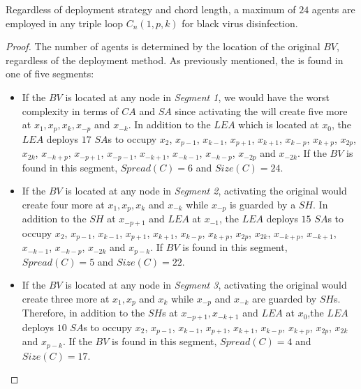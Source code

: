 \begin{theorem}

Regardless of deployment strategy and chord length, a maximum of $24$ agents are employed  in   any   triple loop $C_n(1,p,k)$ for black virus disinfection.
\end{theorem}
\begin{proof}
The number of agents is determined by the location of the original $BV$, regardless of the deployment method. As previously mentioned, the \bv is found in one of five segments:
\begin{itemize} 
\item 
If the $BV$ is located at any node in {\em Segment 1}, we would have the worst complexity in terms of $CA$ and $SA$ since activating the \bv will create five more \bvs at $x_{1},x_{p},x_{k},x_{-p}$  and $x_{-k}$. In addition to the $LEA$ which is located at $x_{0}$, the $LEA$ deploys $17$  $SA$s to occupy $x_{2}$, $ x_{p-1}$,  $x_{k-1}$, $x_{p+1}$, $x_{k+1}$, $x_{k-p}$, $x_{k+p}$, $x_{2p}$, $x_{2k}$, $x_{-k+p}$, $x_{-p+1}$, $x_{-p-1}$, $x_{-k+1}$, $x_{-k-1}$, $x_{-k-p}$, $x_{-2p}$ and $x_{-2k}$. If the $BV$ is found in this segment, $Spread(C)=6$ and $Size(C)=24$.  
 
\item If the $BV$ is located at any node in {\em Segment 2}, activating the original \bv would create four more \bvs at $x_{1},x_{p},x_{k}$ and $x_{-k}$ while $x_{-p}$ is guarded by a $SH$. In addition to the $SH$ at $x_{-p+1}$ and $LEA$ at $x_{-1}$, the $LEA$ deploys $15$  $SA$s to occupy $x_{2}$, $x_{p-1}$,  $x_{k-1}$, $x_{p+1}$, $x_{k+1}$, $x_{k-p}$, $x_{k+p}$, $x_{2p}$, $x_{2k}$, $x_{-k+p}$, $x_{-k+1}$, $x_{-k-1}$, $x_{-k-p}$, $x_{-2k}$ and $x_{p-k}$. If $BV$ is found in this segment, $Spread(C)=5$ and $Size(C)=22$.   

\item If the $BV$ is located at any node in {\em Segment 3}, activating the original \bv would create three more \bvs at $x_{1},x_{p}$ and $x_{k}$ while $x_{-p}$ and $x_{-k}$ are guarded by $SH$s. Therefore, in addition to the $SH$s at $x_{-p+1},x_{-k+1}$ and $LEA$ at $x_{0}$,the $LEA$ deploys $10$  $SA$s to occupy $x_{2}$, $x_{p-1}$, $x_{k-1}$, $x_{p+1}$, $x_{k+1}$, $x_{k-p}$, $x_{k+p}$, $x_{2p}$, $x_{2k}$ and $x_{p-k}$. If the $BV$ is found in this segment, $Spread(C)=4$ and $Size(C)=17$.   
 

\end{itemize}
\end{proof}
